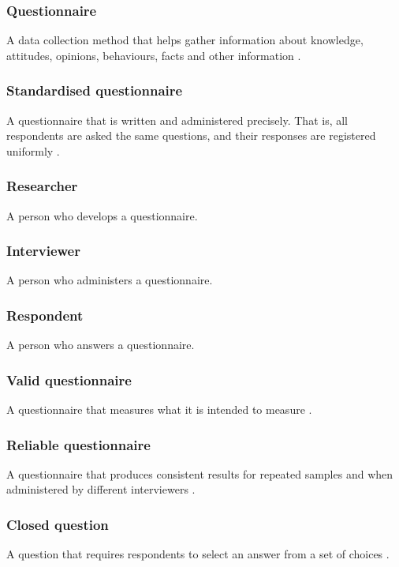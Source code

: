 \subsubsection{Questionnaire}
A data collection method that helps gather information about knowledge, attitudes, opinions, behaviours, facts and other information \autocite{Radhakrishna2007}.

\subsubsection{Standardised questionnaire}
A questionnaire that is written and administered precisely. That is, all respondents are asked the same questions, and their responses are registered uniformly \autocite{Boynton2004c}.

\subsubsection{Researcher}
A person who develops a questionnaire.

\subsubsection{Interviewer}
A person who administers a questionnaire.

\subsubsection{Respondent}
A person who answers a questionnaire.

\subsubsection{Valid questionnaire}
A questionnaire that measures what it is intended to measure \autocite{Boynton2004c}.

\subsubsection{Reliable questionnaire}
A questionnaire that produces consistent results for repeated samples and when administered by different interviewers \autocite{Boynton2004c}.

\subsubsection{Closed question}
A question that requires respondents to select an answer from a set of choices \autocite{Krosnick2009}.


